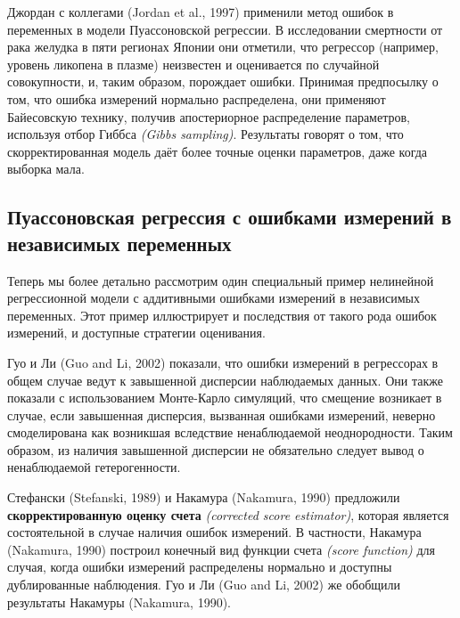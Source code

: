Джордан с коллегами (Jordan et al., 1997) применили метод ошибок в переменных в модели Пуассоновской регрессии. В исследовании смертности от рака желудка в пяти регионах Японии они отметили, что регрессор (например, уровень ликопена в плазме) неизвестен и оценивается по случайной совокупности, и, таким образом, порождает ошибки. Принимая предпосылку о том, что ошибка измерений нормально распределена, они применяют Байесовскую технику, получив апостериорное распределение параметров, используя отбор Гиббса \emph{(Gibbs sampling)}. Результаты говорят о том, что скорректированная модель даёт более точные оценки параметров, даже когда выборка мала.

\subsection{Пуассоновская регрессия с ошибками измерений в независимых переменных} 
Теперь мы более детально рассмотрим один специальный пример нелинейной регрессионной модели с аддитивными ошибками измерений в независимых переменных. Этот пример иллюстрирует и последствия от такого рода ошибок измерений, и доступные стратегии оценивания.

Гуо и Ли (Guo and Li, 2002) показали, что ошибки измерений в регрессорах в общем случае ведут к завышенной дисперсии наблюдаемых данных. Они также показали с использованием Монте-Карло симуляций, что смещение возникает в случае, если завышенная дисперсия, вызванная ошибками измерений, неверно смоделирована как возникшая вследствие ненаблюдаемой неоднородности. Таким образом, из наличия завышенной дисперсии не обязательно следует вывод о ненаблюдаемой гетерогенности.

Стефански (Stefanski, 1989) и Накамура (Nakamura, 1990) предложили {\bf скорректированную оценку счета} \emph{(corrected score estimator)}, которая является состоятельной в случае наличия ошибок измерений. В частности, Накамура (Nakamura, 1990) построил конечный вид функции счета \emph{(score function)} для случая, когда ошибки измерений распределены нормально и доступны дублированные наблюдения. Гуо и Ли (Guo and Li, 2002) же обобщили результаты Накамуры (Nakamura, 1990).

